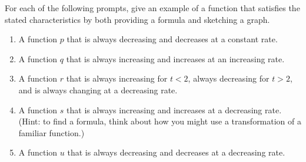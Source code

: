 \documentclass[nooutcomes]{ximera}
\begin{document}
\begin{exploration}

For each of the following prompts, give an example of a function that satisfies the stated characteristics by both providing a formula and sketching a graph.

\begin{enumerate}[label=\alph*.]
\item A function \(p\) that is always decreasing and decreases at a constant rate.
\item A function \(q\) that is always increasing and increases at an increasing rate.
\item A function \(r\) that is always increasing for \(t \lt 2\), always decreasing for \(t \gt 2\), and is always changing at a decreasing rate.
\item A function \(s\) that is always increasing and increases at a decreasing rate.  (Hint: to find a formula, think about how you might use a transformation of a familiar function.)
\item A function \(u\) that is always decreasing and decreases at a decreasing rate.

\end{enumerate}

\end{exploration}
\end{document}
